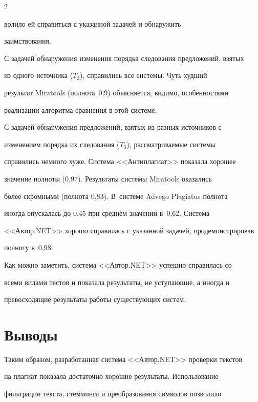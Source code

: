 \begin{multicols}{2}
\addtocounter{table}{1}





\noindent

волило ей справиться с указанной задачей и обнаружить 

заимствования.

  

  С задачей обнаружения изменения порядка следования предложений, взятых 

из одного источника ($T_2$), справились все сис\-те\-мы. Чуть худший 

результат {Miratools} (полнота~0,9) объясняется, видимо, особенностями 

реализации алгоритма сравнения в этой сис\-теме. 

  

  С задачей обнаружения предложений, взятых из разных источников с 

изменением порядка их следования ($T_3$), рассматриваемые сис\-те\-мы 

справились немного хуже. Сис\-те\-ма <<Антиплагиат>> показала хорошее 

значение полноты (0,97). Результаты сис\-те\-мы {Miratools} оказались 

более скромными (полнота 0,83). В~сис\-те\-ме {Advego Plagiatus} полнота 

иногда опускалась до 0,45 при среднем значении в~0,62. Сис\-те\-ма 

<<Автор.NET>> хорошо справилась с указанной задачей, продемонстрировав 

полноту в~0,98.

  

  Как можно заметить, сис\-те\-ма <<Автор.NET>> успешно справилась со 

всеми видами тестов и показала результаты, не уступающие, а иногда и 

превосходящие результаты работы существующих сис\-тем. 



\section{Выводы}



  Таким образом, разработанная сис\-те\-ма <<Автор.NET>> проверки текстов 

на плагиат показала достаточно хорошие результаты. Использование 

фильтрации текста, стемминга и преобразования символов позволило 


\end{multicols}
